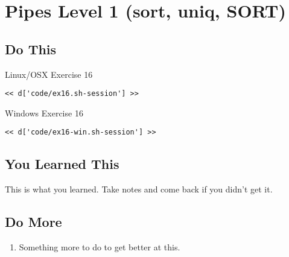 \chapter{Pipes Level 1 (sort, uniq, SORT)}

\section{Do This}

\begin{code}{Linux/OSX Exercise 16}
\begin{Verbatim}
<< d['code/ex16.sh-session'] >>
\end{Verbatim}
\end{code}

\begin{code}{Windows Exercise 16}
\begin{Verbatim}
<< d['code/ex16-win.sh-session'] >>
\end{Verbatim}
\end{code}

\section{You Learned This}

This is what you learned.  Take notes and come back if you didn't get it.

\section{Do More}

\begin{enumerate}
\item Something more to do to get better at this.
\end{enumerate}

